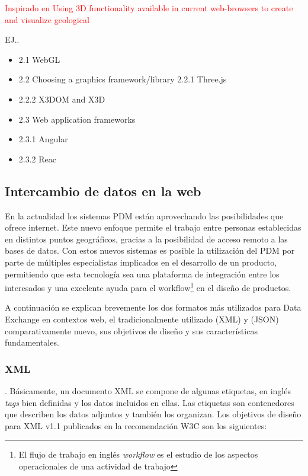 \textcolor{red}{Inspirado en Using 3D functionality available in current web-browsers to create and visualize geological}

EJ..
\begin{itemize}
    \item 2.1 WebGL
    \item 2.2 Choosing a graphics framework/library 2.2.1 Three.js
    \item 2.2.2 X3DOM and X3D
    \item 2.3 Web application frameworks \item 2.3.1 Angular \item 2.3.2 Reac
\end{itemize}



\clearpage
\subsection{Intercambio de datos en la web}

En la actualidad los sistemas PDM están aprovechando las posibilidades que ofrece internet. Este nuevo enfoque permite el trabajo entre personas establecidas en distintos puntos geográficos, gracias a la posibilidad de acceso remoto a las bases de datos. 
Con estos nuevos sistemas es posible la utilización del PDM por parte de múltiples especialistas implicados en el desarrollo de un producto, permitiendo que esta tecnología sea una plataforma de integración entre los interesados y una excelente ayuda para el workflow\footnote{El flujo de trabajo en inglés \textit{workflow} es el estudio de los aspectos operacionales de una actividad de trabajo} en el diseño de productos.


A continuación se explican brevemente los dos formatos más utilizados para Data Exchange en contextos web, el tradicionalmente utilizado (XML) y (JSON) comparativamente nuevo, sus objetivos de diseño y sus características fundamentales.

\subsubsection{XML}

 \citep{Zunke2014}. Básicamente, un documento XML se compone de algunas etiquetas, en inglés \textit{tags} bien definidas y los datos incluidos en ellas. Las etiquetas son contenedores que describen los datos adjuntos y también los organizan. Los objetivos de diseño para XML v1.1 publicados en la recomendación W3C son los siguientes:

